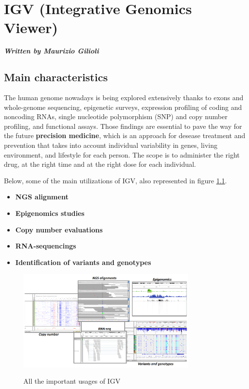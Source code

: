 \graphicspath{{chapters/IGVimages/}}

\chapter{IGV (Integrative Genomics Viewer)} \label{chap: IGV}

\textbf{\textit{Written by Maurizio Gilioli}}

\section{Main characteristics}
The human genome nowadays is being explored extensively thanks to exons and
whole-genome sequencing, epigenetic surveys, expression profiling of coding and
noncoding RNAs, single nucleotide polymorphism (SNP) and copy number profiling,
and functional assays. Those findings are essential to pave the way for the
future \textbf{precision medicine}, which is an approach for desease treatment
and prevention that takes into account individual variability in genes, living
environment, and lifestyle for each person. The scope is to administer the right
drug, at the right time and at the right dose for each individual. 

Below, some of the main utilizations of IGV, also represented in figure
\ref*{IGVusages}.
\begin{itemize}
  \item \textbf{NGS alignment}
  \item \textbf{Epigenomics studies}
  \item \textbf{Copy number evaluations}
  \item \textbf{RNA-sequencings}
  \item \textbf{Identification of variants and genotypes}
\end{itemize}

\begin{figure}[H]
    \caption{All the important usages of IGV}
    \centering
    \includegraphics[width=0.8\textwidth]{usagesIGV.PNG}
    \label{IGVusages}
\end{figure}

